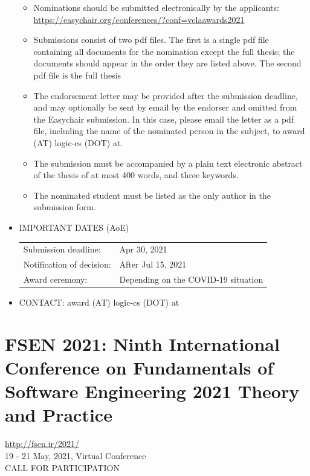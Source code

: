 \documentclass[prodmode,acmtecs]{acmsmall} %
\begin{document}
\begin{itemize}
\begin{itemize}\item  Nominations should be submitted electronically by the applicants: \href{https://easychair.org/conferences/?conf=vclaawards2021}{https://easychair.org/conferences/?conf=vclaawards2021}
\item  Submissions consist of two pdf files. The first is a single pdf file containing all documents for the nomination except the full thesis; the documents should appear in the order they are listed above. The second pdf file is the full thesis
\item  The endorsement letter may be provided after the submission deadline, and  may optionally be sent by email by the endorser and omitted from the Easychair submission. In this case, please email the letter as a pdf file, including the name of the nominated person in the subject, to award (AT) logic-cs (DOT) at.
\item  The submission must be accompanied by a plain text electronic abstract of the thesis of at most 400 words, and three keywords. 
\item   The nominated student must be listed as the only author in the submission form.
\end{itemize} 
\item  IMPORTANT DATES (AoE) 
 
\begin{tabulary}{\linewidth}{LL}Submission deadline:  & Apr 30, 2021 \\
Notification of decision:  & After Jul 15, 2021 \\
Award ceremony:  & Depending on the COVID-19 situation \\
\end{tabulary}
 
\item  CONTACT: award (AT) logic-cs (DOT) at 
 
\end{itemize}\section{FSEN 2021: Ninth International Conference on Fundamentals of Software Engineering 2021 Theory and Practice}\label{FSEN2021}  \href{http://fsen.ir/2021/}{http://fsen.ir/2021/}\\ 
  19 - 21 May, 2021, Virtual Conference\\ 
CALL FOR PARTICIPATION 
\end{document}
